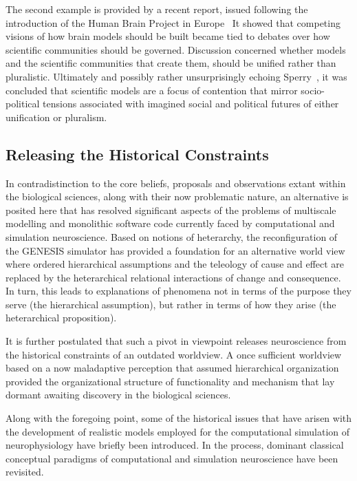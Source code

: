 \documentclass[10pt,letterpaper]{article}
\begin{document}
The second example is provided by a recent report, issued following the introduction of the Human Brain Project in Europe~\cite{mahfoud21} It showed that competing visions of how brain models should be built became tied to debates over how scientific communities should be governed. Discussion concerned whether models and the scientific communities that create them, should be unified rather than pluralistic. Ultimately and possibly rather unsurprisingly echoing Sperry~\cite{sperry80}, it was concluded that scientific models are a focus of contention that mirror socio-political tensions associated with imagined social and political futures of either unification or pluralism.


\subsection*{Releasing the Historical Constraints}

In contradistinction to the core beliefs, proposals and observations extant within the biological sciences, along with their now problematic nature, an alternative is posited here that has resolved significant aspects of the problems of multiscale modelling and monolithic software code currently faced by computational and simulation neuroscience. Based on notions of heterarchy, the reconfiguration of the GENESIS simulator has provided a foundation for an alternative world view where ordered hierarchical assumptions and the teleology of cause and effect are replaced by the heterarchical relational interactions of change and consequence. In turn, this leads to explanations of phenomena not in terms of the purpose they serve (the hierarchical assumption), but rather in terms of how they arise (the heterarchical proposition).

It is further postulated that such a pivot in viewpoint releases neuroscience from the historical constraints of an outdated worldview. A once sufficient worldview based on a now maladaptive perception that assumed hierarchical organization provided the organizational structure of functionality and mechanism that lay dormant awaiting discovery in the biological sciences.

Along with the foregoing point, some of the historical issues that have arisen with the development of realistic models employed for the computational simulation of neurophysiology have briefly been introduced. In the process, dominant classical conceptual paradigms of computational and simulation neuroscience have been revisited.
\end{document}
